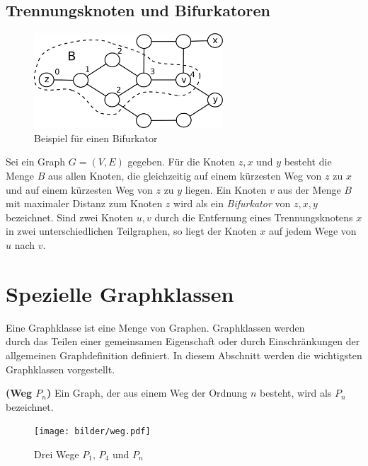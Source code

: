 \subsection{Trennungsknoten und Bifurkatoren}
\begin{figure}[ht]
\centering
\includegraphics*[width = 200pt]{bilder/bifurkator.pdf}
\caption{Beispiel für einen Bifurkator}
\label{bild:bifurkator}
\end{figure}  	 
Sei ein Graph $G=(V,E)$ gegeben. Für die Knoten $z,x$ und $y$ besteht die Menge $B$ aus allen Knoten, die gleichzeitig auf einem kürzesten Weg von $z$ zu $x$ und auf einem kürzesten Weg von $z$ zu $y$ liegen. Ein Knoten $v$ aus der Menge $B$ mit maximaler Distanz zum Knoten $z$ wird als ein \emph{Bifurkator} von $z, x, y$ bezeichnet.\newline
Sind zwei Knoten $u,v$ durch die Entfernung eines Trennungsknotens $x$ in zwei unterschiedlichen Teilgraphen, so liegt der Knoten $x$ auf jedem Wege von $u$ nach $v$.
\newpage
\section{Spezielle Graphklassen}
Eine Graphklasse ist eine Menge von Graphen. Graphklassen werden\\ durch das Teilen einer gemeinsamen Eigenschaft oder durch Einschränkungen der allgemeinen Graphdefinition definiert. In diesem Abschnitt werden die wichtigsten Graphklassen vorgestellt.

\begin{defi}{\textbf{(Weg $P_n$)}}\newline
Ein Graph, der aus einem Weg der Ordnung $n$ besteht, wird als $P_n$ bezeichnet. \end{defi}
\begin{figure}[h!]
		\centering 		 
   \texttt{[image: bilder/weg.pdf]}
	\caption{Drei Wege $P_1$, $P_4$ und $P_n$}
  	 \end{figure}

